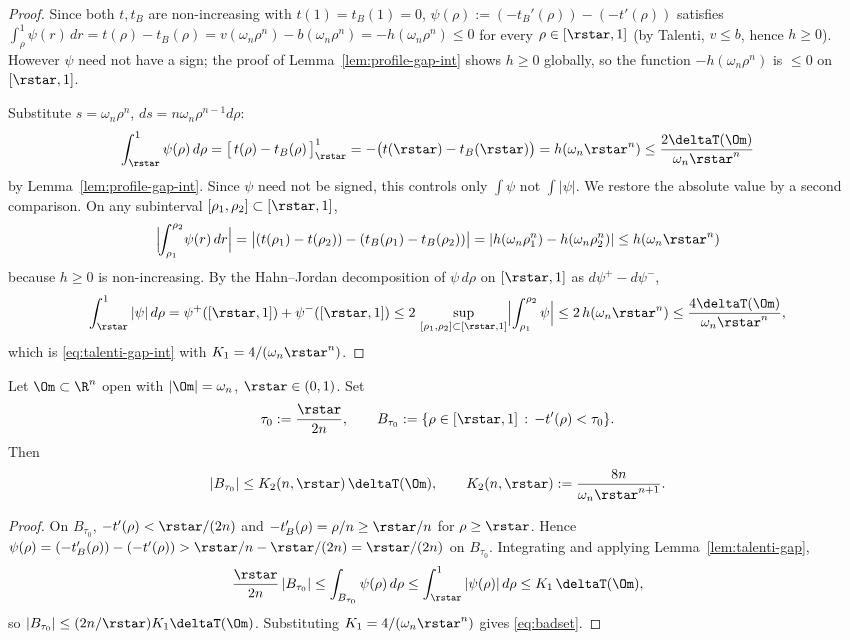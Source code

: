 \begin{proof}
Since both $t,t_B$ are non-increasing with $t(1)=t_B(1)=0$,
$\psi(\rho):=(-t_B'(\rho))-(-t'(\rho))$ satisfies
$\int_\rho^1\psi(r)\,dr=t(\rho)-t_B(\rho)=v(\omega_n\rho^n)-b(\omega_n\rho^n)
=-h(\omega_n\rho^n)\le 0$ for every $\rho\in[\rstar,1]$
(by Talenti, $v\le b$, hence $h\ge 0$). However $\psi$ need not
have a sign; the proof of Lemma~\ref{lem:profile-gap-int} shows
$h\ge 0$ globally, so the function $-h(\omega_n\rho^n)$ is
$\le 0$ on $[\rstar,1]$.

Substitute $s=\omega_n\rho^n$, $ds=n\omega_n\rho^{n-1}d\rho$:
\[
   \int_{\rstar}^1\psi(\rho)\,d\rho
   =\bigl[\,t(\rho)-t_B(\rho)\,\bigr]_{\rstar}^1
   =-\bigl(t(\rstar)-t_B(\rstar)\bigr)
   =h(\omega_n\rstar^n)
   \le \frac{2\deltaT(\Om)}{\omega_n\rstar^n}
\]
by Lemma~\ref{lem:profile-gap-int}. Since $\psi$ need not be signed,
this controls only $\int\psi$ not $\int|\psi|$. We restore the
absolute value by a second comparison. On any subinterval
$[\rho_1,\rho_2]\subset[\rstar,1]$,
\[
   \Bigl|\!\int_{\rho_1}^{\rho_2}\!\psi(r)\,dr\Bigr|
   =\bigl|(t(\rho_1)-t(\rho_2))-(t_B(\rho_1)-t_B(\rho_2))\bigr|
   =|h(\omega_n\rho_1^n)-h(\omega_n\rho_2^n)|
   \le h(\omega_n\rstar^n)
\]
because $h\ge 0$ is non-increasing. By the
Hahn--Jordan decomposition of $\psi\,d\rho$ on $[\rstar,1]$ as
$d\psi^+-d\psi^-$,
\[
   \int_{\rstar}^1|\psi|\,d\rho
   =\psi^+([\rstar,1])+\psi^-([\rstar,1])
   \le 2\,\sup_{[\rho_1,\rho_2]\subset[\rstar,1]}
   \Bigl|\int_{\rho_1}^{\rho_2}\psi\Bigr|
   \le 2\,h(\omega_n\rstar^n)
   \le\frac{4\deltaT(\Om)}{\omega_n\rstar^n},
\]
which is \eqref{eq:talenti-gap-int} with
$K_1=4/(\omega_n\rstar^n)$.
\end{proof}

\begin{lemma}
\label{lem:badset}
Let $\Om\subset\R^n$ open with $|\Om|=\omega_n$, $\rstar\in(0,1)$.
Set
\[
   \tau_0:=\frac{\rstar}{2n},
   \qquad
   B_{\tau_0}:=\{\rho\in[\rstar,1]\,:\,-t'(\rho)<\tau_0\}.
\]
Then
\begin{equation}\label{eq:badset}
   |B_{\tau_0}|\le K_2(n,\rstar)\,\deltaT(\Om),
   \qquad K_2(n,\rstar):=\frac{8n}{\omega_n\rstar^{n+1}}.
\end{equation}
\end{lemma}

\begin{proof}
On $B_{\tau_0}$, $-t'(\rho)<\rstar/(2n)$ and $-t_B'(\rho)=\rho/n\ge\rstar/n$
for $\rho\ge\rstar$. Hence
$\psi(\rho)=(-t_B'(\rho))-(-t'(\rho))>\rstar/n-\rstar/(2n)=\rstar/(2n)$
on $B_{\tau_0}$. Integrating and applying
Lemma~\ref{lem:talenti-gap},
\[
   \frac{\rstar}{2n}\,|B_{\tau_0}|
   \le\int_{B_{\tau_0}}\psi(\rho)\,d\rho
   \le\int_{\rstar}^{1}|\psi(\rho)|\,d\rho
   \le K_1\,\deltaT(\Om),
\]
so $|B_{\tau_0}|\le (2n/\rstar)K_1\deltaT(\Om)$. Substituting
$K_1=4/(\omega_n\rstar^n)$ gives \eqref{eq:badset}.
\end{proof}

